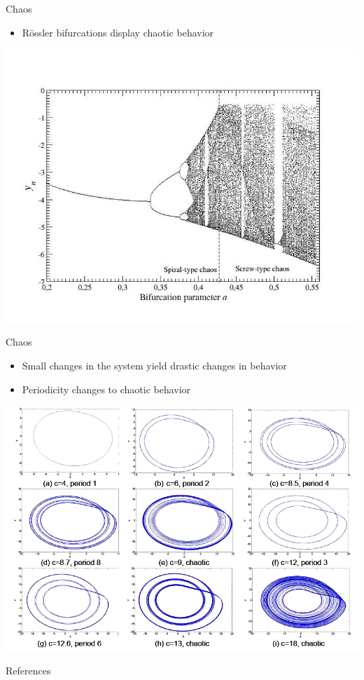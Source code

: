 \documentclass{beamer}
\begin{document}
\begin{frame}{Chaos}
	\begin{itemize}
		\item R\"{o}ssler bifurcations display chaotic behavior
		\pause
	\end{itemize}
	\begin{center}
		\includegraphics[scale=0.3]{bifur}
	\end{center}
\end{frame}

\begin{frame}{Chaos}
	\begin{itemize}
		\item Small changes in the system yield drastic changes in behavior
		\pause
		\item Periodicity changes to chaotic behavior
	\end{itemize}
	\pause
	\begin{center}
		\includegraphics[scale=0.3]{varying_c}
	\end{center}
\end{frame}

\begin{frame}{References}
	\nocite{*}
	
	
\end{frame}
\end{document}
